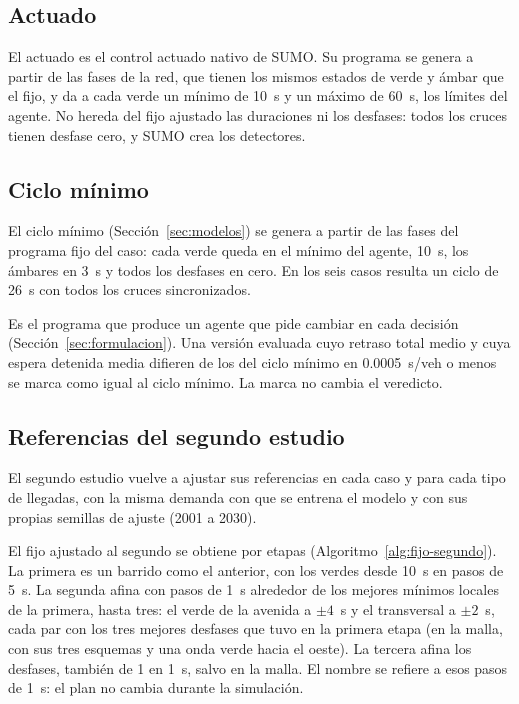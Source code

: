 \subsection{Actuado}

El actuado es el control actuado nativo de SUMO. Su programa se genera
a partir de las fases de la red, que tienen los mismos estados de verde
y ámbar que el fijo, y da a cada verde un mínimo de 10~s y un máximo de
60~s, los límites del agente. No hereda del fijo ajustado las
duraciones ni los desfases: todos los cruces tienen desfase cero, y
SUMO crea los detectores.

\subsection{Ciclo mínimo}
\label{sec:programa-trivial}

El ciclo mínimo (Sección~\ref{sec:modelos}) se genera a partir de las
fases del programa fijo del caso: cada verde queda en el mínimo del
agente, 10~s, los ámbares en 3~s y todos los desfases en cero. En los seis casos resulta un ciclo de
26~s con todos los cruces sincronizados.

Es el programa que produce un agente que pide cambiar en cada decisión
(Sección~\ref{sec:formulacion}). Una versión evaluada cuyo
retraso total medio y cuya espera detenida media difieren de los del
ciclo mínimo en 0.0005~s/veh o menos se marca como igual al ciclo
mínimo. La marca no cambia el veredicto.

\subsection{Referencias del segundo estudio}
\label{sec:referencias-segundo}

El segundo estudio vuelve a ajustar sus referencias en cada caso y para
cada tipo de llegadas, con la misma demanda con que se entrena el
modelo y con sus propias semillas de ajuste (2001 a 2030).

El fijo ajustado al segundo se obtiene por etapas
(Algoritmo~\ref{alg:fijo-segundo}). La primera es un
barrido como el anterior, con los verdes desde 10~s en pasos de 5~s.
La segunda afina con pasos de 1~s alrededor de los mejores mínimos
locales de la primera, hasta tres: el verde de la avenida a $\pm 4$~s y
el transversal a $\pm 2$~s, cada par con los tres mejores desfases que
tuvo en la primera etapa (en la malla, con sus tres esquemas y una onda
verde hacia el oeste). La tercera afina los desfases, también de 1 en
1~s, salvo en la malla. El nombre se refiere a esos pasos de 1~s: el
plan no cambia durante la simulación.

